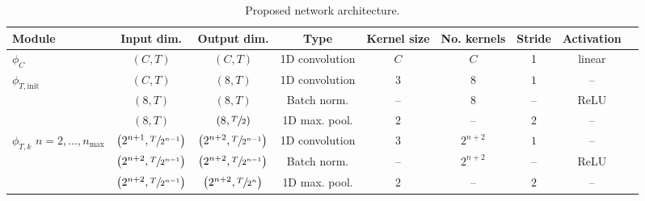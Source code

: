 \begin{landscape}
\begin{table}
\begin{threeparttable}
  \centering
  \caption{Proposed network architecture.}
  \label{tab:paperiv-network}
  \begin{tabular}{lcccccccc} \toprule
    Module                                                     & Input dim.                                 & Output dim.                                    & Type           & Kernel size & No. kernels                  & Stride      & Activation \\ \midrule
    $\phi_{C}$                                                 & $\left(C, T\right)$                        & $\left(C, T\right)$                            & 1D convolution & $C$         & $C$                          & 1           & linear \\ \midrule
                      & $\left(C, T\right)$                        & $\left(8, T\right)$                            & 1D convolution & $3$         & 8                            & $1$         & -- \\
                                                               & $\left(8, T\right)$                        & $\left(8, T\right)$                            & Batch norm.    & --          & 8                            & --          & ReLU \\
                                                               & $\left(8, T\right)$                        & $\left(8, \sfrac{T}{2}\right)$                 & 1D max. pool.  & $2$         & --                           & $2$         & -- \\
     & $\left(2^{n+1}, \sfrac{T}{2^{n-1}}\right)$ & $\left(2^{n+2}, \sfrac{T}{2^{n-1}}\right)$     & 1D convolution & $3$         & $2^{n+2}$                    & $1$         & -- \\
                                                               & $\left(2^{n+2}, \sfrac{T}{2^{n-1}}\right)$ & $\left(2^{n+2}, \sfrac{T}{2^{n-1}}\right)$     & Batch norm.    & --          & $2^{n+2}$                    & --          & ReLU \\
                                                               & $\left(2^{n+2}, \sfrac{T}{2^{n-1}}\right)$ & $\left(2^{n+2}, \sfrac{T}{2^{n}}\right)$       & 1D max. pool.  & $2$         & --                           & $2$         & -- \\ 

\end{tabular}
\end{threeparttable}
\end{table}
\end{landscape}
